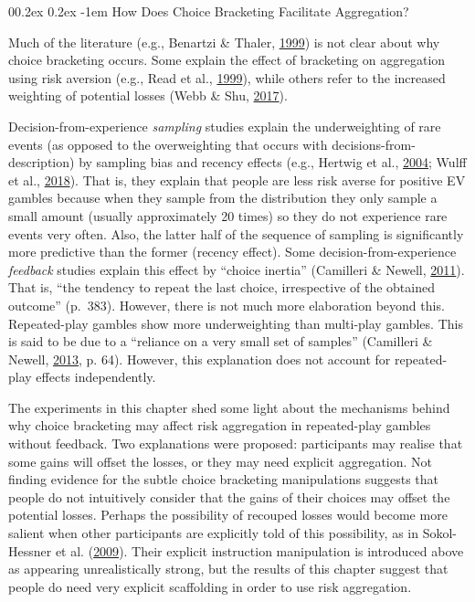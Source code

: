 \documentclass[
  english,
  man, donotrepeattitle,floatsintext]{apa7}
\makeatletter
\let\oldparagraph\paragraph
\renewcommand{\paragraph}[1]{\oldparagraph{#1}\mbox{}}
\renewcommand{\paragraph}{\@startsection{paragraph}{4}{\parindent}%
  {0\baselineskip \@plus 0.2ex \@minus 0.2ex}%
  {-1em}%
  {\normalfont\normalsize\bfseries\itshape\typesectitle}}
\theoremstyle{definition}
\theoremstyle{definition}
\theoremstyle{definition}
\theoremstyle{definition}
\theoremstyle{remark}
\makeatother
\begin{document}
\hypertarget{how-does-choice-bracketing-facilitate-aggregation}{%
\paragraph{How Does Choice Bracketing Facilitate Aggregation?}\label{how-does-choice-bracketing-facilitate-aggregation}}

Much of the literature (e.g., Benartzi \& Thaler, \protect\hyperlink{ref-benartzi1999}{1999}) is not clear about why choice
bracketing occurs. Some explain the effect of bracketing on aggregation using
risk aversion (e.g., Read et al., \protect\hyperlink{ref-read1999}{1999}), while others refer to the increased weighting
of potential losses (Webb \& Shu, \protect\hyperlink{ref-webb2017}{2017}).

Decision-from-experience \emph{sampling} studies explain the underweighting of rare
events (as opposed to the overweighting that occurs with
decisions-from-description) by sampling bias and recency effects (e.g., Hertwig et al., \protect\hyperlink{ref-hertwig2004}{2004}; Wulff et al., \protect\hyperlink{ref-wulff2018}{2018}). That is, they explain that people are less risk
averse for positive EV gambles because when they sample from the distribution
they only sample a small amount (usually approximately 20 times) so they do not
experience rare events very often. Also, the latter half of the sequence of
sampling is significantly more predictive than the former (recency effect). Some
decision-from-experience \emph{feedback} studies explain this effect by ``choice
inertia'' (Camilleri \& Newell, \protect\hyperlink{ref-camilleri2011}{2011}). That is, ``the tendency to repeat the last choice,
irrespective of the obtained outcome'' (p.~383). However, there is not much more
elaboration beyond this. Repeated-play gambles show more underweighting than
multi-play gambles. This is said to be due to a ``reliance on a very small set of
samples'' (Camilleri \& Newell, \protect\hyperlink{ref-camilleri2013}{2013}, p. 64). However, this explanation does not account for
repeated-play effects independently.

The experiments in this chapter shed some light about the mechanisms behind why
choice bracketing may affect risk aggregation in repeated-play gambles without
feedback. Two explanations were proposed: participants may realise that some
gains will offset the losses, or they may need explicit aggregation. Not finding
evidence for the subtle choice bracketing manipulations suggests that people do
not intuitively consider that the gains of their choices may offset the
potential losses. Perhaps the possibility of recouped losses would become more
salient when other participants are explicitly told of this possibility, as in
Sokol-Hessner et al. (\protect\hyperlink{ref-sokolhessner2009}{2009}). Their explicit instruction manipulation is introduced above
as appearing unrealistically strong, but the results of this chapter suggest
that people do need very explicit scaffolding in order to use risk aggregation.
\end{document}
